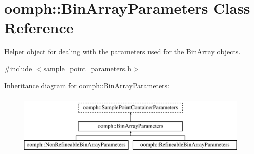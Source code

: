 \hypertarget{classoomph_1_1BinArrayParameters}{}\section{oomph\+:\+:Bin\+Array\+Parameters Class Reference}
\label{classoomph_1_1BinArrayParameters}


Helper object for dealing with the parameters used for the \hyperlink{classBinArray}{Bin\+Array} objects.  




{\ttfamily \#include $<$sample\+\_\+point\+\_\+parameters.\+h$>$}

Inheritance diagram for oomph\+:\+:Bin\+Array\+Parameters\+:\begin{figure}[H]
\begin{center}
\leavevmode
\includegraphics[height=3.000000cm]{classoomph_1_1BinArrayParameters}
\end{center}
\end{figure}
